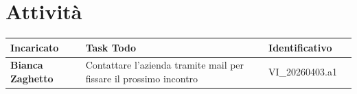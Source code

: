 \documentclass[a4paper,12pt]{article}
\begin{document}
\section{Attività} {
        \begin{tabularx}{\textwidth}{|l|X|l|l|}
            \hline
            \textbf{Incaricato} & \textbf{Task Todo} & \textbf{Identificativo} \\
            \hline
            \textbf{Bianca Zaghetto} & Contattare l'azienda tramite mail per fissare il prossimo incontro & VI\_20260403.a1 \\
            \hline
        \end{tabularx}
}
\end{document}

